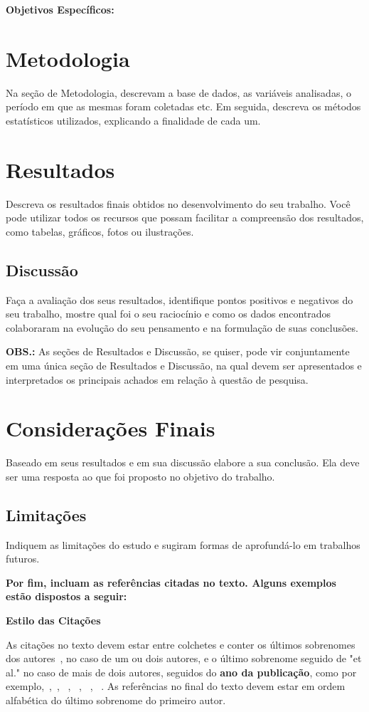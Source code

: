 \documentclass[a4paper,11pt]{article}
\begin{document}
\textbf{Objetivos Específicos:}


\section{Metodologia}
Na seção de Metodologia, descrevam a base de dados, as variáveis analisadas, o período em que as mesmas foram coletadas etc. Em seguida, descreva os métodos estatísticos utilizados, explicando a finalidade de cada um.

\section{Resultados}
Descreva os resultados finais obtidos no desenvolvimento do seu trabalho. Você pode utilizar todos os recursos que possam facilitar a compreensão dos resultados, como tabelas, gráficos, fotos ou ilustrações.

\subsection{Discussão}
Faça a avaliação dos seus resultados, identifique pontos positivos e negativos do seu trabalho, mostre qual foi o seu raciocínio e como os dados encontrados colaboraram na evolução do seu pensamento e na formulação de suas conclusões.

\vspace{0.2cm}
\noindent \textbf{OBS.:} As seções de Resultados e Discussão, se quiser, pode vir conjuntamente em uma única seção de Resultados e Discussão, na qual devem ser apresentados e interpretados os principais achados em relação à questão de pesquisa.

\section{Considerações Finais}
Baseado em seus resultados e em sua discussão elabore a sua conclusão. Ela deve ser uma resposta ao que foi proposto no objetivo do trabalho.

\subsection{Limitações}
Indiquem as limitações do estudo e sugiram formas de aprofundá-lo em trabalhos futuros.

\vspace{1cm}
\noindent \textbf{Por fim, incluam as referências citadas no texto. Alguns exemplos estão dispostos a seguir:}

\vspace{0.2cm}



\vspace{1cm}
\textbf{Estilo das Citações}

As citações no texto devem estar entre colchetes e conter  os últimos sobrenomes dos autores~\citep{silva:99}, no caso de um ou dois autores, e o último sobrenome seguido de "et al." no caso de mais de dois autores, seguidos do \textbf{ano da publicação}, como por exemplo,~\citep{anna:06},~\citep{gates:03}, ~\citep{smith:02}, ~\citep{silva:99}, ~\citep{pele:04}, ~\citep{web:16}.
As referências no final do texto devem estar em ordem alfabética do último sobrenome do primeiro autor.
\end{document}
